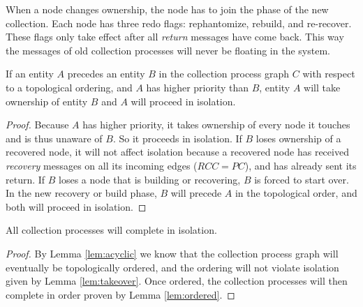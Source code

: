 When a node changes ownership, the node has to join the phase of the new collection.
Each
node has three redo flags: rephantomize, rebuild,
and re-recover.
These flags only take effect
after all \emph{return} messages %
have come back.
This way the messages of old collection processes will never be floating
in the system.


\begin{lemma}
If an entity $A$ precedes an entity $B$ in the collection process
graph $C$ with respect to a topological ordering, and $A$ has higher priority than $B$, entity $A$ will take ownership of
entity $B$ and $A$ will proceed in isolation.
\label{lem:takeover}
\end{lemma}
\begin{proof}
Because $A$ has higher priority, it takes ownership of every node it
touches and is thus unaware of $B$. So it proceeds in isolation. If $B$ loses
ownership of a recovered node, it will not affect isolation because a recovered
node has received \emph{recovery} messages on all its incoming edges ($RCC=PC$),
and has already sent its return.
If $B$ loses a node that is building or recovering,
$B$ is forced to start over. In
the new recovery or build phase, $B$ will precede $A$ in the  topological order, and both will
proceed in isolation. %
\end{proof}

\begin{theorem}
All collection processes will complete in isolation.
\label{thm:alliso}
\end{theorem}
\begin{proof}
By Lemma \ref{lem:acyclic} we know that the collection process graph will eventually
be topologically ordered, and the ordering will not violate
isolation given by Lemma \ref{lem:takeover}. Once ordered, the
collection processes will then complete in order proven by Lemma \ref{lem:ordered}.
\end{proof}

